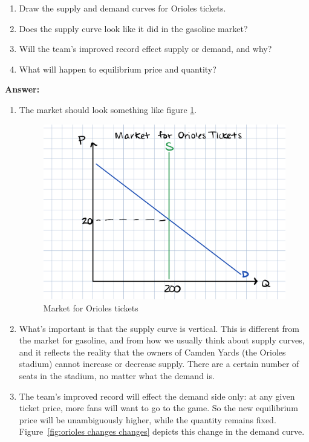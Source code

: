 \documentclass[12pt]{article}
\begin{document}
\begin{enumerate}
    \item Draw the supply and demand curves for Orioles tickets.
    \item Does the supply curve look like it did in the gasoline market?
    \item Will the team's improved record effect supply or demand, and why?
    \item What will happen to equilibrium price and quantity?
\end{enumerate}

\textbf{Answer: }

\begin{enumerate}

\item The market should look something like figure \ref{fig:orioles}.

\begin{figure}[H]
    \centering
    \includegraphics[width=.6\textwidth]{orioles.png}
    \caption{Market for Orioles tickets}
    \label{fig:orioles}
\end{figure}

\item What's important is that the supply curve is vertical. This is different from the market for gasoline, and from how we usually think about supply curves, and it reflects the reality that the owners of Camden Yards (the Orioles stadium) cannot increase or decrease supply. There are a certain number of seats in the stadium, no matter what the demand is.

\medskip

\item The team's improved record will effect the demand side only: at any given ticket price, more fans will want to go to the game. So the new equilibrium price will be unambiguously higher, while the quantity remains fixed. Figure~\ref{fig:orioles changes changes} depicts this change in the demand curve.


\end{enumerate}
\end{document}
